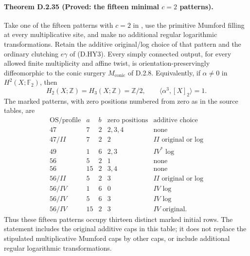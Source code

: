 \paragraph{Theorem D.2.35 (Proved: the fifteen minimal $c=2$ patterns).}
Take one of the fifteen patterns with $c=2$ in
, use the primitive
Mumford filling at every multiplicative site, and make no additional
regular logarithmic transformations. Retain the additive original/log
choice of that pattern and the ordinary clutching $e\gamma$ of
(D.HY3). Every simply connected output, for every allowed finite
multiplicity and affine twist, is orientation-preservingly diffeomorphic
to the conic surgery $M_{\mathrm{conic}}$ of D.2.8. Equivalently, if
$\alpha\ne0$ in $H^2(X;\mathbb F_2)$, then
\[
 H_2(X;\mathbb Z)=H_3(X;\mathbb Z)=\mathbb Z/2,
 \qquad \langle\alpha^3,[X]_2\rangle=1.                 \tag{D.C21}
\]
The marked patterns, with zero positions numbered from zero as in the
source tables, are
\[
\begin{array}{c|r|r|l|l}
\text{OS/profile}&a&b&\text{zero positions}&\text{additive choice}\\\hline
47&7&2&2,3,4&\text{none}\\
47/II&7&2&2&II\text{ original or log}\\
49&1&6&2,3&IV^*\text{ log}\\
56&5&2&1&\text{none}\\
56&15&2&3,4&\text{none}\\
56/II&5&2&3&II\text{ original or log}\\
56/IV&1&6&0&IV\text{ log}\\
56/IV&5&6&3&IV\text{ log}\\
56/IV&15&2&3&IV\text{ original}.
\end{array}                                                   \tag{D.C22}
\]
Thus these fifteen patterns occupy thirteen distinct marked initial
rows. The statement includes the original additive caps in this table;
it does not replace the stipulated multiplicative Mumford caps by
other caps, or include additional regular logarithmic transformations.

